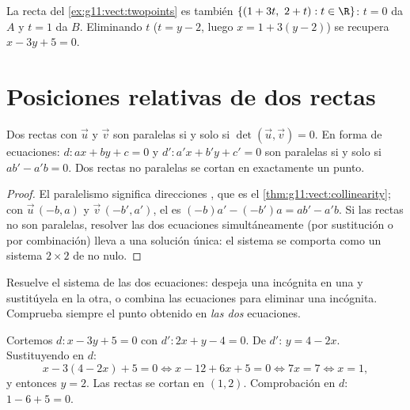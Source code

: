 \begin{example}
La recta del \cref{ex:g11:vect:twopoints} es también
$\{(1 + 3t,\ 2 + t) : t \in \R\}$: $t = 0$ da $A$ y $t = 1$ da $B$.
Eliminando $t$ ($t = y - 2$, luego $x = 1 + 3(y-2)$) se recupera
$x - 3y + 5 = 0$.
\end{example}

\section{Posiciones relativas de dos rectas}

\begin{proposition}\label{prop:g11:vect:positions}
Dos rectas con  $\vec u$ y $\vec v$ son paralelas si y
solo si $\det(\vec u, \vec v) = 0$. En forma de ecuaciones:
$d : ax + by + c = 0$ y $d' : a'x + b'y + c' = 0$ son paralelas si y solo
si $ab' - a'b = 0$. Dos rectas no paralelas se cortan en exactamente un
punto.
\end{proposition}

\begin{proof}
El paralelismo significa direcciones , que es el
\cref{thm:g11:vect:collinearity}; con $\vec u\,(-b, a)$ y
$\vec v\,(-b', a')$, el  es $(-b)a' - (-b')a = ab' - a'b$. Si
las rectas no son paralelas, resolver las dos ecuaciones simultáneamente
(por sustitución o por combinación) lleva a una solución única: el sistema
se comporta como un sistema $2 \times 2$ de  no nulo.
\end{proof}

\begin{method}\label{met:g11:vect:intersection}
Resuelve el sistema de las dos ecuaciones: despeja una incógnita en una
 y sustitúyela en la otra, o combina las ecuaciones para eliminar
una incógnita. Comprueba siempre el punto obtenido en \emph{las dos}
ecuaciones.
\end{method}

\begin{example}\label{ex:g11:vect:intersection}
Cortemos $d: x - 3y + 5 = 0$ con $d': 2x + y - 4 = 0$. De $d'$:
$y = 4 - 2x$. Sustituyendo en $d$:
\[
x - 3(4 - 2x) + 5 = 0
\iff x - 12 + 6x + 5 = 0
\iff 7x = 7
\iff x = 1,
\]
y entonces $y = 2$. Las rectas se cortan en $(1, 2)$. Comprobación en
$d$: $1 - 6 + 5 = 0$.
\end{example}

